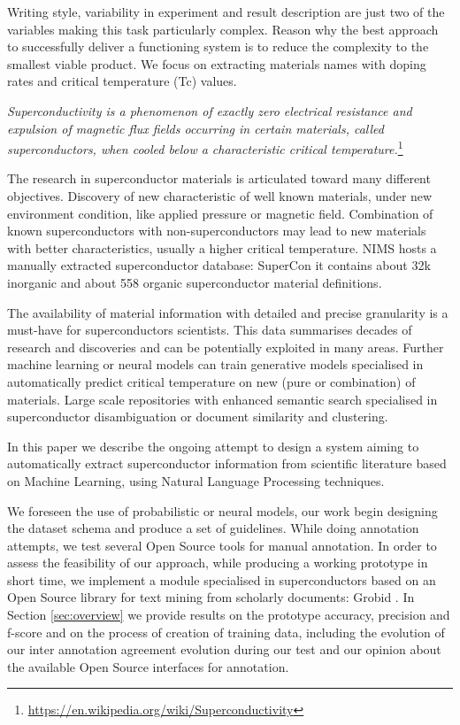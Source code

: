 \documentclass{article}
\begin{document}
Writing style, variability in experiment and result description are just two of the variables making this task particularly complex. Reason why the best approach to successfully deliver a functioning system is to reduce the complexity to the smallest viable product.
We focus on extracting materials names with doping rates and critical temperature (Tc) values.


\textit{Superconductivity is a phenomenon of exactly zero electrical resistance and expulsion of magnetic flux fields occurring in certain materials, called superconductors, when cooled below a characteristic critical temperature.}\footnote{\url{https://en.wikipedia.org/wiki/Superconductivity}}

The research in superconductor materials is articulated toward many different objectives. Discovery of new characteristic of well known materials, under new environment condition, like applied pressure or magnetic field. Combination of known superconductors with non-superconductors may lead to new materials with better characteristics, usually a higher critical temperature. 
NIMS hosts a manually extracted superconductor database:  SuperCon\cite{SuperCon} it contains about 32k inorganic and about 558 organic superconductor material definitions. 

The availability of material information with detailed and precise granularity is a must-have for superconductors scientists. This data summarises decades of research and discoveries and can be potentially exploited in many areas. Further machine learning or neural models can train generative models specialised in automatically predict critical temperature \cite{DBLP:journals/corr/abs-1812-01995} on new (pure or combination) of materials. Large scale repositories with enhanced semantic search specialised in superconductor disambiguation or document similarity and clustering. 

In this paper we describe the ongoing attempt to design a system aiming to automatically extract superconductor information from scientific literature based on Machine Learning, using Natural Language Processing techniques.

We foreseen the use of probabilistic or neural models, our work begin designing the dataset schema and produce a set of guidelines. While doing annotation attempts, we test several Open Source tools for manual annotation.
In order to assess the feasibility of our approach, while producing a working prototype in short time, we implement a module specialised in superconductors based on an Open Source library for text mining from scholarly documents: Grobid \cite{GROBID} \cite{lopez2009grobid}.
In Section \ref{sec:overview} we provide results on the prototype accuracy, precision and f-score and on the process of creation of training data, including the evolution of our inter annotation agreement evolution during our test and our opinion about the available Open Source interfaces for annotation. 
\end{document}
